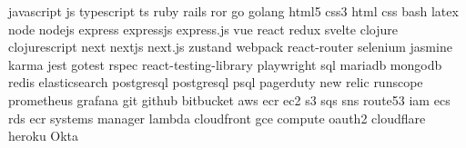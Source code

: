 \documentclass[letterpaper,11pt]{article}
\newcommand{\semitransp}[2][0.0]{{\transparent{#1}#2}}
\begin{document}
 \semitransp{
  javascript js typescript ts ruby rails ror go golang html5 css3 html css bash latex
  node nodejs express expressjs express.js vue react redux svelte clojure clojurescript
  next nextjs next.js zustand webpack react-router selenium jasmine karma jest gotest rspec
  react-testing-library playwright sql mariadb mongodb redis elasticsearch postgresql postgresql
  psql pagerduty new relic runscope prometheus grafana git github bitbucket aws ecr ec2 s3 sqs
  sns route53 iam ecs rds ecr systems manager lambda cloudfront gce compute oauth2 cloudflare
  heroku Okta
 }
\end{document}
